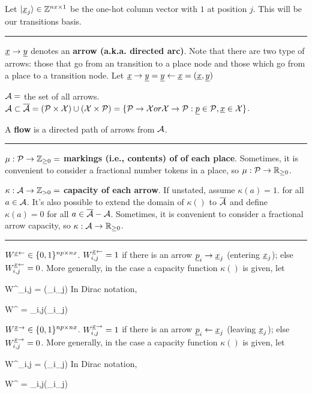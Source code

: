 Let $|{\underline{x}}_j\rangle\in {\mathbb{Z}}^{nx\times 1}$ be the one-hot 
column vector with
$1$ at position $j$. This will be our {transitions basis}.

\hrule

${\underline{x}}\rightarrow {\underline{y}}$ denotes an {\bf arrow (a.k.a. directed arc)}. Note that there are two type of arrows:
those that go from an transition to a place node and those which go from a place to
a transition node. Let ${\underline{x}}\rightarrow{\underline{y}}={\underline{y}}\leftarrow {\underline{x}} = ({\underline{x}},{\underline{y}})$

${\cal A} =$  the set of all arrows. ${\cal A} \subset \overline{{\cal A}} = ({\cal P} \times {\cal X}) \cup ({\cal X} \times {\cal P}) = \{{\cal P}\rightarrow{\cal X} or {\cal X} \rightarrow {\cal P}:
{\underline{p}}\in{\cal P}, {\underline{x}} \in {\cal X}\}$.


A {\bf flow} is a directed path of arrows from ${\cal A}$.

\hrule
$\mu : {\cal P} \rightarrow {\mathbb{Z}}_{\geq 0}=$ {\bf markings (i.e., contents) of of each place}. Sometimes, it is convenient to consider a fractional number tokens in a place, so
$\mu : {\cal P} \rightarrow { \mathbb{R}}_{\geq 0}$.



$\kappa : {\cal A}\rightarrow {\mathbb{Z}}_{>0}=$ {\bf capacity of each arrow}. If unstated, assume $\kappa(a) = 1$.
for all $a\in{\cal A}$. It's also possible to extend the domain of 
$\kappa()$ to $\overline{{\cal A}}$ and define $\kappa(a) = 0$
for all $a\in \overline{{\cal A}}-{\cal A}$. Sometimes, it is convenient to consider a fractional arrow capacity, so
$\kappa : {\cal A} \rightarrow { \mathbb{R}}_{\geq 0}$.

\hrule
$W^{{\underline{x}} \leftarrow} \in \{0,1\}^{np\times nx}$. 
$W^{{\underline{x}} \leftarrow}_{i,j} = 1$ if there is an arrow ${\underline{p}}_i\rightarrow{\underline{x}}_j$
(entering ${\underline{x}}_j$);
else $W^{{\underline{x}} \leftarrow}_{i,j} = 0$. More generally, in the case a capacity function $\kappa()$ is given, let

\beq
W^{\rvx \larrow}_{i,j} = \kappa(\rvp_i\rarrow \rvx_j)
\eeq
In Dirac notation, 

\beq
W^{\rvx \larrow} = \sum_{i,j}\kappa(\rvp_i\rarrow \rvx_j)
\eeq


$W^{{\underline{x}} \rightarrow} \in \{0,1\}^{np\times nx}$. 
$W^{{\underline{x}} \rightarrow}_{i,j} = 1$ if there is an arrow ${\underline{p}}_i\leftarrow{\underline{x}}_j$
(leaving ${\underline{x}}_j$);
else $W^{{\underline{x}} \rightarrow}_{i,j} = 0$. More generally, in the case a capacity function $\kappa()$ is given, let

\beq
W^{\rvx \rarrow}_{i,j} = \kappa(\rvp_i\larrow \rvx_j)
\eeq
In Dirac notation, 

\beq
W^{\rvx \rarrow} = \sum_{i,j}\kappa(\rvp_i\larrow \rvx_j)
\eeq

